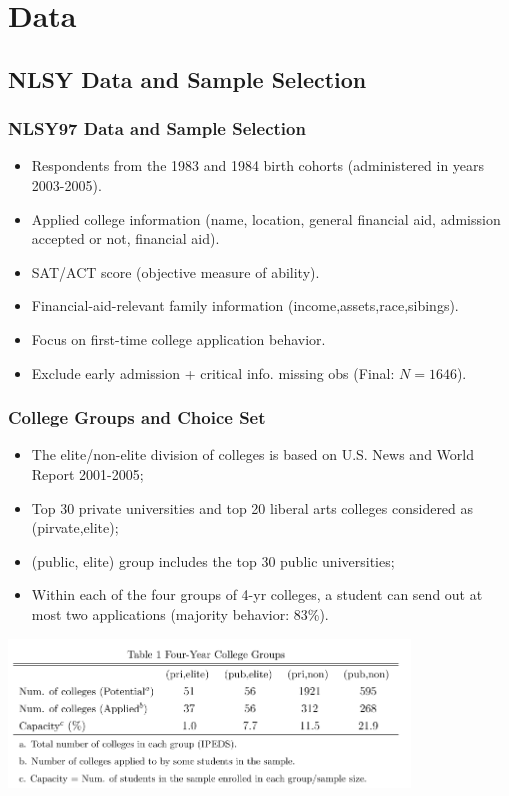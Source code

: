 \documentclass[10pt]{beamer}
\begin{document}
\section{Data}
\subsection{NLSY Data and Sample Selection}
\begin{frame}[c]\frametitle{NLSY97 Data and Sample Selection}

\begin{itemize}
    \item Respondents from the 1983 and 1984 birth cohorts (administered in years 2003-2005).
    \item Applied college information (name, location, general financial aid, admission accepted or not, financial aid).
    \item  SAT/ACT score (objective measure of ability).
    \item  Financial-aid-relevant family information (income,assets,race,sibings).
    \item  Focus on first-time college application behavior.
    \item  Exclude early admission + critical info. missing obs (Final: $N=1646$).
\end{itemize}

\end{frame}

\begin{frame}[c]\frametitle{College Groups and Choice Set}

\begin{itemize}
    \item The elite/non-elite division of colleges is based on U.S. News and World Report 2001-2005;
    \item Top 30 private universities and top 20 liberal arts colleges considered as (pirvate,elite);
    \item (public, elite) group includes the top 30 public universities;
    \item Within each of the four groups of 4-yr colleges, a student can send out at most two applications (majority behavior: 83\%).
\end{itemize}
\centerline{\includegraphics[width=0.8\textwidth]{table1.png}}
\end{frame}
\end{document}
